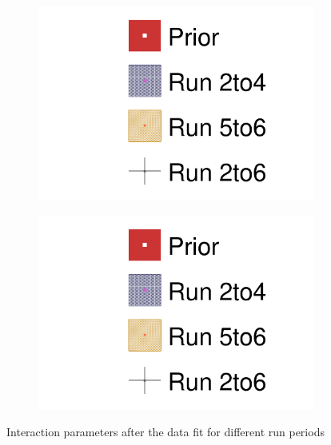 \begin{figure}[h]
	\begin{subfigure}[t]{0.49\textwidth}
		\includegraphics[width=\textwidth, trim={0mm 0mm 0mm 0mm}, clip,page=20]{figures/mach3/data/alt/2017b_Run2to4_Data_merge_2017b_Run56_Data_merge_2017b_NewData_NewDet_UpdXsecStep_2Xsec_4Det_5Flux_0}
	\end{subfigure}
	\begin{subfigure}[t]{0.49\textwidth}
		\includegraphics[width=\textwidth, trim={0mm 0mm 0mm 0mm}, clip,page=21]{figures/mach3/data/alt/2017b_Run2to4_Data_merge_2017b_Run56_Data_merge_2017b_NewData_NewDet_UpdXsecStep_2Xsec_4Det_5Flux_0}
	\end{subfigure}
	\caption{Interaction parameters after the data fit for different run periods}
	\label{fig:xsec_data_nuvsnubar}
\end{figure}

